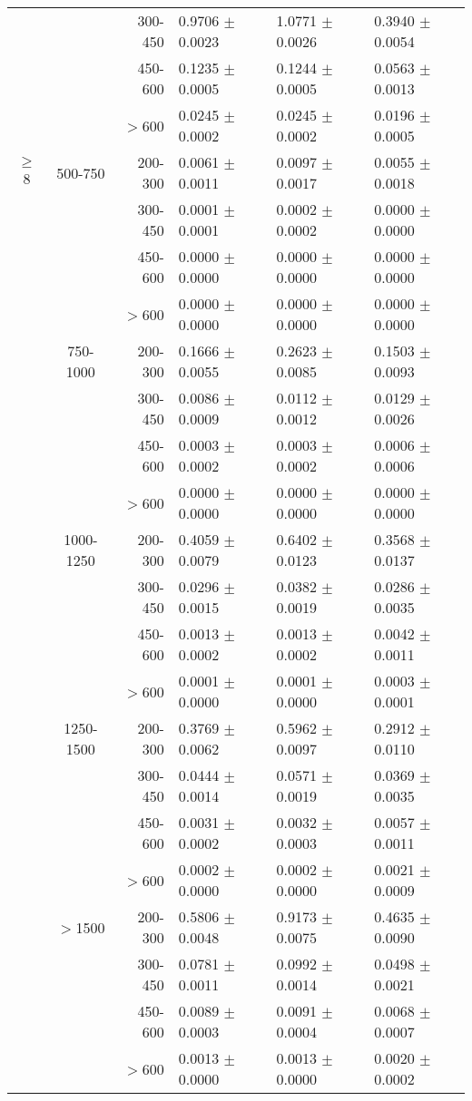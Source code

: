 \documentclass[11pt]{amsart}
\begin{document}
\begin{table}[htdp]
\begin{center}
\begin{tabular}{|c|c|r|l|l|l|}
  	&				& 300-450 & 	0.9706 $\pm$ 0.0023  & 	1.0771 $\pm$ 0.0026  & 	0.3940 $\pm$ 0.0054 \\
  	&				& 450-600 & 	0.1235 $\pm$ 0.0005  & 	0.1244 $\pm$ 0.0005  & 	0.0563 $\pm$ 0.0013 \\
  	&				& $>$600 & 	0.0245 $\pm$ 0.0002  & 	0.0245 $\pm$ 0.0002  & 	0.0196 $\pm$ 0.0005 \\
\hline
$\geq$8& 500-750	& 200-300 & 	0.0061 $\pm$ 0.0011  & 	0.0097 $\pm$ 0.0017  & 	0.0055 $\pm$ 0.0018 \\
  	&				& 300-450 & 	0.0001 $\pm$ 0.0001  & 	0.0002 $\pm$ 0.0002  & 	0.0000 $\pm$ 0.0000 \\
  	&				& 450-600 & 	0.0000 $\pm$ 0.0000  & 	0.0000 $\pm$ 0.0000  & 	0.0000 $\pm$ 0.0000 \\
  	&				& $>$600 & 	0.0000 $\pm$ 0.0000  & 	0.0000 $\pm$ 0.0000  & 	0.0000 $\pm$ 0.0000 \\
  	& 750-1000  & 200-300 & 	0.1666 $\pm$ 0.0055  & 	0.2623 $\pm$ 0.0085  & 	0.1503 $\pm$ 0.0093 \\
  	&				& 300-450 & 	0.0086 $\pm$ 0.0009  & 	0.0112 $\pm$ 0.0012  & 	0.0129 $\pm$ 0.0026 \\
  	&				& 450-600 & 	0.0003 $\pm$ 0.0002  & 	0.0003 $\pm$ 0.0002  & 	0.0006 $\pm$ 0.0006 \\
  	&				& $>$600 & 	0.0000 $\pm$ 0.0000  & 	0.0000 $\pm$ 0.0000  & 	0.0000 $\pm$ 0.0000 \\
  	& 1000-1250 & 200-300 & 	0.4059 $\pm$ 0.0079  & 	0.6402 $\pm$ 0.0123  & 	0.3568 $\pm$ 0.0137 \\
  	&				& 300-450 & 	0.0296 $\pm$ 0.0015  & 	0.0382 $\pm$ 0.0019  & 	0.0286 $\pm$ 0.0035 \\
  	&				& 450-600 & 	0.0013 $\pm$ 0.0002  & 	0.0013 $\pm$ 0.0002  & 	0.0042 $\pm$ 0.0011 \\
  	&				& $>$600 & 	0.0001 $\pm$ 0.0000  & 	0.0001 $\pm$ 0.0000  & 	0.0003 $\pm$ 0.0001 \\
  	& 1250-1500 & 200-300 & 	0.3769 $\pm$ 0.0062  & 	0.5962 $\pm$ 0.0097  & 	0.2912 $\pm$ 0.0110 \\
  	&				& 300-450 & 	0.0444 $\pm$ 0.0014  & 	0.0571 $\pm$ 0.0019  & 	0.0369 $\pm$ 0.0035 \\
  	&				& 450-600 & 	0.0031 $\pm$ 0.0002  & 	0.0032 $\pm$ 0.0003  & 	0.0057 $\pm$ 0.0011 \\
  	&				& $>$600 & 	0.0002 $\pm$ 0.0000  & 	0.0002 $\pm$ 0.0000  & 	0.0021 $\pm$ 0.0009 \\
  	& $>$1500 		& 200-300 & 	0.5806 $\pm$ 0.0048  & 	0.9173 $\pm$ 0.0075  & 	0.4635 $\pm$ 0.0090 \\
  	&				& 300-450 & 	0.0781 $\pm$ 0.0011  & 	0.0992 $\pm$ 0.0014  & 	0.0498 $\pm$ 0.0021 \\
  	&				& 450-600 & 	0.0089 $\pm$ 0.0003  & 	0.0091 $\pm$ 0.0004  & 	0.0068 $\pm$ 0.0007 \\
  	&				& $>$600 & 	0.0013 $\pm$ 0.0000  & 	0.0013 $\pm$ 0.0000  & 	0.0020 $\pm$ 0.0002 \\
\hline
\end{tabular}
\end{center}
\label{default}
\end{table}%
\end{document}
